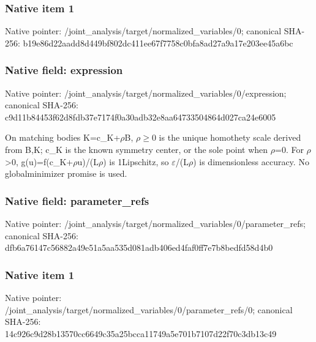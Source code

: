 \documentclass[10pt,a4paper]{article}
\begin{document}
\subsubsection{Native item 1}


Native pointer: /joint\_analysis/target/n\allowbreak{}ormalized\_variables/0; canonical SHA-256: b19e86d22aadd8d449bf802d\allowbreak{}c411ee67f7758c0bfa8ad27a\allowbreak{}9a17e203ee45a6bc



\subsubsection{Native field: expression}


Native pointer: /joint\_analysis/target/n\allowbreak{}ormalized\_variables/0/ex\allowbreak{}pression; canonical SHA-256: c9d11b84453f62d8fdb37e71\allowbreak{}74f0a30adb32e8aa64733504\allowbreak{}864d027ca24e6005


On matching bodies K=c\_K+\ensuremath{\rho}B, \ensuremath{\rho}\ensuremath{\ge}0 is the unique homothety scale derived from B,K; c\_K is the known symmetry center, or the sole point when \ensuremath{\rho}=0. For \ensuremath{\rho}>0, g(u)=f(c\_K+\ensuremath{\rho}u)/(L\ensuremath{\rho}) is 1Lipschitz, so \ensuremath{\varepsilon}/(L\ensuremath{\rho}) is dimensionless accuracy. No globalminimizer promise is used.


\subsubsection{Native field: parameter\_refs}


Native pointer: /joint\_analysis/target/n\allowbreak{}ormalized\_variables/0/pa\allowbreak{}rameter\_refs; canonical SHA-256: dfb6a76147c56882a49e51a5\allowbreak{}aa535d081adb406ed4faf0ff\allowbreak{}7e7b8bedfd58d4b0



\subsubsection{Native item 1}


Native pointer: /joint\_analysis/target/n\allowbreak{}ormalized\_variables/0/pa\allowbreak{}rameter\_refs/0; canonical SHA-256: 14c926c9d28b13570cc6649c\allowbreak{}35a25bcca11749a5e701b710\allowbreak{}7d22f70c3db13c49
\end{document}
